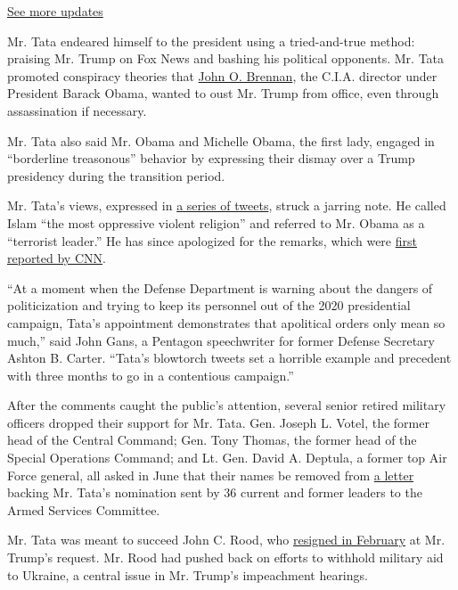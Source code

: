 \href{https://www.nytimes.com/2020/08/03/us/elections/biden-vs-trump.html?action=click\&pgtype=Article\&state=default\&region=MAIN_CONTENT_1\&context=storylines_live_updates}{See
more updates}

Mr. Tata endeared himself to the president using a tried-and-true
method: praising Mr. Trump on Fox News and bashing his political
opponents. Mr. Tata promoted conspiracy theories that
\href{https://www.nytimes.com/2018/06/27/magazine/john-brennan-president-trump-national-security-state.html}{John
O. Brennan}, the C.I.A. director under President Barack Obama, wanted to
oust Mr. Trump from office, even through assassination if necessary.

Mr. Tata also said Mr. Obama and Michelle Obama, the first lady, engaged
in ``borderline treasonous'' behavior by expressing their dismay over a
Trump presidency during the transition period.

Mr. Tata's views, expressed in
\href{https://twitter.com/ajtata/status/1014278134185840640}{a series of
tweets}, struck a jarring note. He called Islam ``the most oppressive
violent religion'' and referred to Mr. Obama as a ``terrorist leader.''
He has since apologized for the remarks, which were
\href{https://edition.cnn.com/2020/06/12/politics/pentagon-nominee-tata-trump-kfile/index.html}{first
reported by CNN}.

``At a moment when the Defense Department is warning about the dangers
of politicization and trying to keep its personnel out of the 2020
presidential campaign, Tata's appointment demonstrates that apolitical
orders only mean so much,'' said John Gans, a Pentagon speechwriter for
former Defense Secretary Ashton B. Carter. ``Tata's blowtorch tweets set
a horrible example and precedent with three months to go in a
contentious campaign.''

After the comments caught the public's attention, several senior retired
military officers dropped their support for Mr. Tata. Gen. Joseph L.
Votel, the former head of the Central Command; Gen. Tony Thomas, the
former head of the Special Operations Command; and Lt. Gen. David A.
Deptula, a former top Air Force general, all asked in June that their
names be removed from
\href{https://s.wsj.net/public/resources/documents/Tata-Letter_06-18-2020.pdf}{a
letter} backing Mr. Tata's nomination sent by 36 current and former
leaders to the Armed Services Committee.

Mr. Tata was meant to succeed John C. Rood, who
\href{https://www.nytimes.com/2020/02/19/us/politics/john-rood-trump.html}{resigned
in February} at Mr. Trump's request. Mr. Rood had pushed back on efforts
to withhold military aid to Ukraine, a central issue in Mr. Trump's
impeachment hearings.

